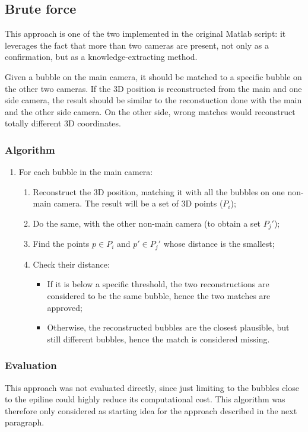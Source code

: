 \subsection{Brute force}
\label{sec:match:bruteforce}

This approach is one of the two implemented in the original Matlab script: it leverages the fact that more than two cameras are present, not only as a confirmation, but as a knowledge-extracting method.

Given a bubble on the main camera, it should be matched to a specific bubble on the other two cameras.
If the 3D position is reconstructed from the main and one side camera, the result should be similar to the reconstuction done with the main and the other side camera.
On the other side, wrong matches would reconstruct totally different 3D coordinates.

\subsubsection{Algorithm}

\begin{enumerate}
	\itemsep 0em
	\item For each bubble in the main camera:
	      \begin{enumerate}
		      \item Reconstruct the 3D position, matching it with all the bubbles on one non-main camera. The result will be a set of 3D points ($P_i$);
		      \item Do the same, with the other non-main camera (to obtain a set $P_j'$);
		      \item Find the points $p\in P_i$ and $p'\in P_j'$ whose distance is the smallest;
		      \item Check their distance:
		      \begin{itemize}
				\item If it is below a specific threshold, the two reconstructions are considered to be the same bubble, hence the two matches are approved;
				\item Otherwise, the reconstructed bubbles are the closest plausible, but still different bubbles, hence the match is considered missing.
			  \end{itemize}
	      \end{enumerate}
\end{enumerate}

\subsubsection{Evaluation}

This approach was not evaluated directly, since just limiting to the bubbles close to the epiline could highly reduce its computational cost.
This algorithm was therefore only considered as starting idea for the approach described in the next paragraph.
